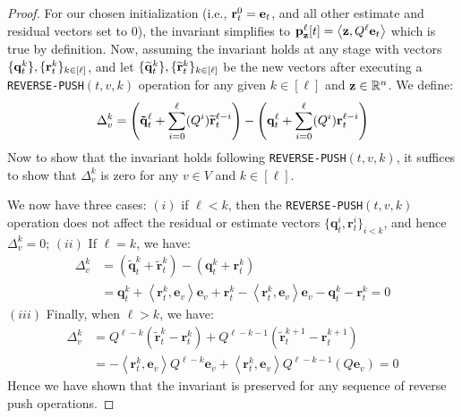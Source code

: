 \begin{proof}
For our chosen initialization (i.e., $\mathbf{r}^{0}_t = \mathbf{e}_t$, and all other estimate and residual vectors set to $0$), the invariant simplifies to $\mathbf{p}_{\mathbf{z}}^{\ell}[t] = \left< \mathbf{z} , Q^{\ell}\mathbf{e}_t \right>$ which is true by definition.
Now, assuming the invariant holds at any stage with vectors $\{\mathbf{q}^{k}_t\}, \{\mathbf{r}^{k}_t\}_{k\in[\ell]}$, and let $\{\widetilde{\mathbf{q}}^{k}_t\}, \{\widetilde{\mathbf{r}}^{k}_t\}_{k\in[\ell]}$ be the new vectors after executing a \texttt{REVERSE-PUSH}$(t,v,k)$ operation for any given $k\in[\ell]$ and $\mathbf{z}\in\mathbb{R}^n$. We define:
$$\Delta_v^{k} = \left( \mathbf{\tilde{q}}_t^{\ell} + \sum_{i=0}^{\ell}  (Q^i)\widetilde{\mathbf{r}}^{\ell-i}_t \right)- \left( \mathbf{q}^{\ell}_t + \sum_{i=0}^{\ell}  (Q^i) \mathbf{r}_t^{\ell-i}\right)$$
Now to show that the invariant holds following \texttt{REVERSE-PUSH}$(t,v,k)$, it suffices to show that $\Delta_v^{k}$ is zero for any $v\in V$ and $k\in[\ell]$. 

We now have three cases: $(i)$ if $\ell < k$, then the \texttt{REVERSE-PUSH}$(t,v,k)$ operation does not affect the residual or estimate vectors $\{\mathbf{q}_t^{i},\mathbf{r}_t^{i}\}_{i<k}$, and hence 
$\Delta_v^k=0$;
$(ii)$ If $\ell = k$, we have:
\begin{align*}
\Delta_v^{k} &= \left( \mathbf{\tilde{q}}_t^{k} +  \mathbf{\tilde{r}}_t^{k}\right)- \left( \mathbf{q}_t^{k} + \mathbf{r}_t^{k}\right)\\
&= \mathbf{q}_t^{k} + \left<\mathbf{r}_t^{k}, \mathbf{e}_v \right>\mathbf{e}_v +  \mathbf{r}_t^{k} - \left<\mathbf{r}_t^{k}, \mathbf{e}_v \right>\mathbf{e}_v - \mathbf{q}_t^{k} - \mathbf{r}_t^{k}
= 0
\end{align*}
$(iii)$ Finally, when $\ell > k$, we have: 
\begin{align*}
\Delta_v^k &= Q^{\ell-k}\left( \mathbf{\tilde{r}}_t^k - \mathbf{r}_t^k \right) + Q^{\ell-k-1}\left( \mathbf{\tilde{r}}_t^{k+1} - \mathbf{r}_t^{k+1} \right)\\
&= -\left<\mathbf{r}_t^k, \mathbf{e}_v \right>Q^{\ell-k}\mathbf{e}_v  + \left<\mathbf{r}_t^k, \mathbf{e}_v \right>Q^{\ell-k-1}\left(Q\mathbf{e}_v \right)
= 0
\end{align*}
Hence we have shown that the invariant is preserved for any sequence of reverse push operations.
\end{proof}

